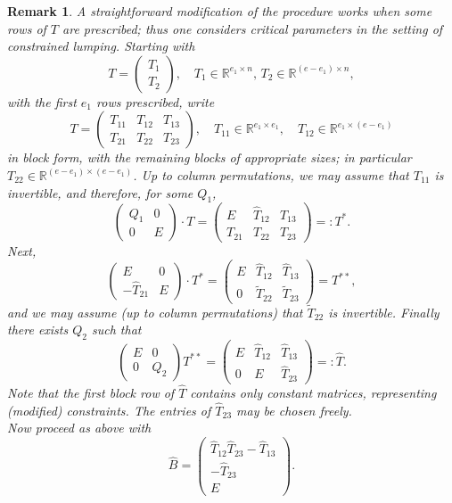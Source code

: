 \documentclass{article}
\newtheorem{remark}{Remark}
\begin{document}
\begin{remark}\label{remconstr}
{\em   A straightforward modification of the procedure works when some rows of $T$ are prescribed; thus one considers critical parameters in the setting of constrained lumping.
Starting with
\[
T=\begin{pmatrix}
    T_1\\ T_2
\end{pmatrix}, \quad T_1\in\mathbb R^{e_1\times n}, \,T_2\in \mathbb R^{(e-e_1)\times n},
\]
with the first $e_1$ rows prescribed, write
\[
T=\begin{pmatrix}
    T_{11}&T_{12}&T_{13}\\ 
     T_{21}&T_{22}&T_{23}
\end{pmatrix},\quad T_{11}\in\mathbb R^{e_1\times e_1},\quad T_{12}\in \mathbb R^{e_1\times(e-e_1)}
\]
in block form, with the remaining blocks of appropriate sizes; in particular $T_{22}\in\mathbb R^{(e-e_1)\times(e-e_1)}$. Up to column permutations, we may assume that $T_{11}$ is invertible, and therefore, for some $Q_1$,
\[
\begin{pmatrix}
    Q_1& 0\\ 0& E
\end{pmatrix}\cdot T= \begin{pmatrix}
    E&\widehat T_{12}&\widehat T_{13} \\
     T_{21}&T_{22}&T_{23}
\end{pmatrix}=:T^*.
\]
Next,
\[
\begin{pmatrix}
    E&0\\ -\widehat T_{21} &E
\end{pmatrix}\cdot T^*=\begin{pmatrix}
    E&\widehat T_{12}&\widehat T_{13} \\
     0&\widetilde T_{22}&\widetilde T_{23}
\end{pmatrix}=T^{**},
\]
and we may assume (up to column permutations) that $\widetilde T_{22}$ is invertible. Finally there exists $Q_2$ such that
\[
\begin{pmatrix}
    E&0\\ 0& Q_2
\end{pmatrix} T^{**}=\begin{pmatrix}
      E&\widehat T_{12}&\widehat T_{13} \\
     0& E &\widehat T_{23}
\end{pmatrix}=:\widehat T.
\]
Note that the first block row of $\widehat T$ contains only constant matrices, representing (modified) constraints. The entries of $\widehat T_{23}$ may be chosen freely. \\
Now proceed as above with
\[
\widehat B=\begin{pmatrix}
     \widehat T_{12}\widehat T_{23}-\widehat T_{13}\\  -\widehat T_{23}\\ E
\end{pmatrix}.
\]
}
\end{remark}
\end{document}
